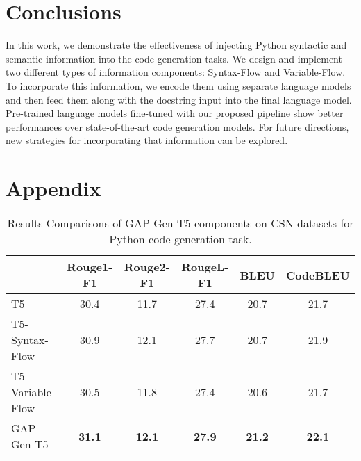 \documentclass[11pt]{article}
\begin{document}
\section{Conclusions}
In this work, we demonstrate the effectiveness of injecting Python syntactic and semantic information into the code generation tasks. We design and implement two different types of information components: Syntax-Flow and Variable-Flow. To incorporate this information, we encode them using separate language models and then feed them along with the docstring input into the final language model. Pre-trained language models fine-tuned with our proposed pipeline show better performances over state-of-the-art code generation models. For future directions, new strategies for incorporating that information can be explored. 




\newpage




\newpage
\appendix

\section{Appendix}

\begin{table*}[ht]
\centering
\begin{tabular}{|l|c|c|c|c|c|}
\hline
                   & Rouge1-F1    & Rouge2-F1     & RougeL-F1  & BLEU   & CodeBLEU                        \\ \hline
T5                 & 30.4   & 11.7   & 27.4   & 20.7  & 21.7                                              \\ \hline
T5-Syntax-Flow   & 30.9  & 12.1  & 27.7   & 20.7  &  21.9                                               \\ \hline
T5-Variable-Flow & 30.5  & 11.8  & 27.4   & 20.6  & 21.7                                                \\ \hline
GAP-Gen-T5         & \textbf{31.1}  & \textbf{12.1}  & \textbf{27.9}   & \textbf{21.2}   & \textbf{22.1}  \\ \hline

\end{tabular}
\caption{Results Comparisons of GAP-Gen-T5 components on CSN datasets for Python code generation task.}
\label{components_results}
\end{table*}
\end{document}
